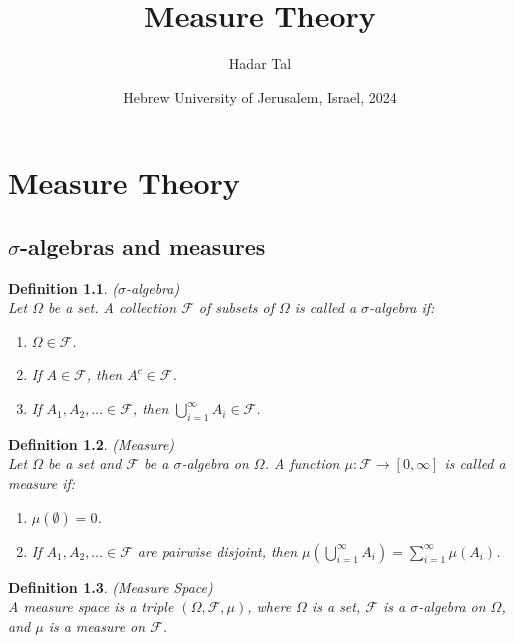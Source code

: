 \documentclass[11pt]{book}
\title{
    \huge Measure Theory\\
    \vspace{10pt}
}
\author{Hadar Tal}
\date{Hebrew University of Jerusalem, Israel, 2024}
\numberwithin{equation}{chapter}
\theoremstyle{boldStyle}
\newtheorem{definition}{Definition}[section]
\begin{document}
\maketitle

\chapter{Measure Theory}

\section{$\sigma$-algebras and measures}

\begin{definition}($\sigma$-algebra) \\
    Let $\Omega$ be a set. A collection $\mathcal{F}$ of subsets of $\Omega$ is called a $\sigma$-algebra if:
    \begin{enumerate}
        \item $\Omega \in \mathcal{F}$.
        \item If $A \in \mathcal{F}$, then $A^c \in \mathcal{F}$.
        \item If $A_1, A_2, \ldots \in \mathcal{F}$, then $\bigcup_{i=1}^{\infty} A_i \in \mathcal{F}$.
    \end{enumerate}
\end{definition}


\begin{definition}(Measure) \\
    Let $\Omega$ be a set and $\mathcal{F}$ be a $\sigma$-algebra on $\Omega$. A function $\mu: \mathcal{F} \to [0, \infty]$ is called a measure if:
    \begin{enumerate}
        \item $\mu(\emptyset) = 0$.
        \item If $A_1, A_2, \ldots \in \mathcal{F}$ are pairwise disjoint, then $\mu\left(\bigcup_{i=1}^{\infty} A_i\right) = \sum_{i=1}^{\infty} \mu(A_i)$.
    \end{enumerate}
\end{definition}

\begin{definition}(Measure Space) \\
    A measure space is a triple $(\Omega, \mathcal{F}, \mu)$, where $\Omega$ is a set, $\mathcal{F}$ 
    is a $\sigma$-algebra on $\Omega$, and $\mu$ is a measure on $\mathcal{F}$.
\end{definition}
\end{document}
